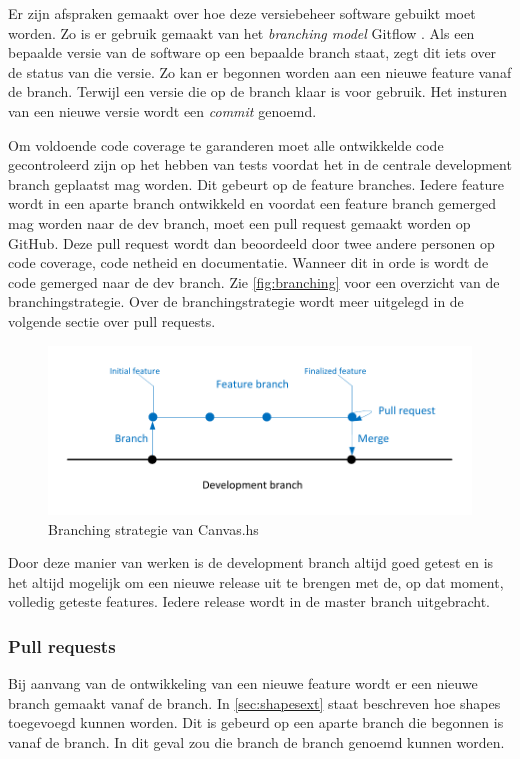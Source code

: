 Er zijn afspraken gemaakt over hoe deze versiebeheer software gebuikt moet worden. Zo is er gebruik gemaakt van het \emph{branching model} Gitflow \cite{Gitflow2010}. Als een bepaalde versie van de software op een bepaalde branch staat, zegt dit iets over de status van die versie. Zo kan er begonnen worden aan een nieuwe feature vanaf de  branch. Terwijl een versie die op de  branch klaar is voor gebruik. Het insturen van een nieuwe versie wordt een \emph{commit} genoemd.

Om voldoende code coverage te garanderen moet alle ontwikkelde code gecontroleerd zijn op het hebben van tests voordat het in de centrale development branch geplaatst mag worden. Dit gebeurt op de feature branches.  Iedere feature wordt in een aparte branch ontwikkeld en voordat een feature branch gemerged mag worden naar de dev branch, moet een pull request gemaakt worden op GitHub. Deze pull request wordt dan beoordeeld door twee andere personen op code coverage, code netheid en documentatie. Wanneer dit in orde is wordt de code gemerged naar de dev branch. Zie  \autoref{fig:branching} voor een overzicht van de branchingstrategie. Over de branchingstrategie wordt meer uitgelegd in de volgende sectie over pull requests.

\begin{figure}
\begin{center}
\includegraphics[keepaspectratio,width=\textwidth]{./images/branching.pdf}
\caption{Branching strategie van Canvas.hs}
\label{fig:branching}
\end{center}
\end{figure}

Door deze manier van werken is de development branch altijd goed getest en is het altijd mogelijk om een nieuwe release uit te brengen met de, op dat moment, volledig geteste features. Iedere release wordt in de master branch uitgebracht.

\subsubsection{Pull requests}
Bij aanvang van de ontwikkeling van een nieuwe feature wordt er een nieuwe branch gemaakt vanaf de  branch. In \autoref{sec:shapesext} staat beschreven hoe  shapes toegevoegd kunnen worden. Dit is gebeurd op een aparte branch die begonnen is vanaf de  branch. In dit geval zou die branch de  branch genoemd kunnen worden.


